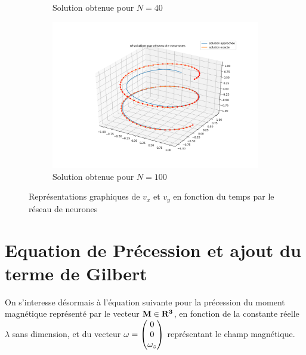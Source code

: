 \documentclass[12pt]{report}
\begin{document}
\begin{figure}
\begin{subfigure}[b]{0.4\textwidth}
        \caption{Solution obtenue pour $N=40$}
    \end{subfigure}
    \hfill
    \begin{subfigure}[b]{0.4\textwidth}
        \centering
        \includegraphics[width=1\textwidth, height=0.9\textwidth]{direct_training_N=100.png}
        \caption{Solution obtenue pour $N=100$}
    \end{subfigure}
       \caption{Représentations graphiques de $v_x$ et  $v_y$ en fonction du temps par le réseau de neurones}
       \label{fig:résultats 2 NN en fonction de N}
\end{figure}



\chapter{Equation de Précession et ajout du terme de Gilbert}

On s'interesse désormais à l'équation suivante pour la précession du moment 
magnétique représenté par le vecteur $\bf{M} \in \mathbf{R}^3$, en fonction de la 
constante réelle $\lambda$ sans dimension, et du vecteur 
$\displaystyle{\bf{\omega} = \begin{pmatrix}
    0 \\
    0 \\
    \omega_z
  \end{pmatrix}}$
représentant le champ magnétique.
\end{document}

